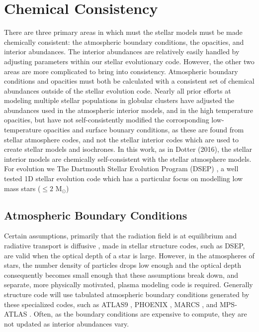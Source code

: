 \section{Chemical Consistency}\label{sec:const}
There are three primary areas in which must the stellar models must be made
chemically consistent: the atmospheric boundary conditions, the opacities, and
interior abundances. The interior abundances are relatively easily handled by
adjusting parameters within our stellar evolutionary code. However, the other
two areas are more complicated to bring into consistency. Atmospheric boundary
conditions and opacities must both be calculated with a consistent set of
chemical abundances outside of the stellar evolution code.
Nearly all prior efforts at modeling multiple stellar populations in
globular clusters have adjusted the abundances used in the atmospheric interior
models, and in the high temperature opacities, but have not self-consistently
modified the corrosponding low-temperature opacities and surface bounary
conditions, as these are found from stellar atmosphere codes, and not the
stellar interior codes which are used to create stellar models and isochrones.
In this work, as in Dotter (2016), the stellar interior models are chemically
self-consistent with the stellar atmosphere models. For evolution we The Dartmouth Stellar
Evolution Program (DSEP) \citep{Dotter2008}, a well tested 1D stellar evolution
code which has a particular focus on modelling low mass stars ($\le 2$
M$_{\odot}$)

\subsection{Atmospheric Boundary Conditions}\label{sec:atm}
Certain assumptions, primarily that the radiation field is at equilibrium and
radiative transport is diffusive \citep{Salaris2005}, made in stellar structure
codes, such as DSEP, are valid when the optical depth of a star is large.
However, in the atmospheres of stars, the number density of particles drops low
enough and the optical depth consequently becomes small enough that these
assumptions break down, and separate, more physically motivated, plasma
modeling code is required. Generally structure code will use tabulated
atmospheric boundary conditions generated by these specialized codes, such as ATLAS9
\citep{Kurucz1993}, PHOENIX \citep{Husser2013}, MARCS \citep{Gustafsson2008},
and MPS-ATLAS \citep{Kostogryz2023}. Often, as the boundary conditions are
expensive to compute, they are not updated as interior abundances vary. 

